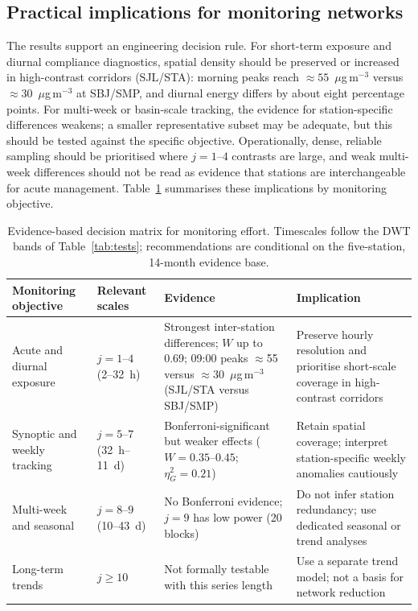 \documentclass[12pt,letterpaper]{article}
\begin{document}
\subsection{Practical implications for monitoring networks}

The results support an engineering decision rule. For short-term exposure and diurnal compliance diagnostics, spatial density should be preserved or increased in high-contrast corridors (SJL/STA): morning peaks reach $\approx 55$~$\mu$g\,m$^{-3}$ versus $\approx 30$~$\mu$g\,m$^{-3}$ at SBJ/SMP, and diurnal energy differs by about eight percentage points. For multi-week or basin-scale tracking, the evidence for station-specific differences weakens; a smaller representative subset may be adequate, but this should be tested against the specific objective. Operationally, dense, reliable sampling should be prioritised where $j=1$--$4$ contrasts are large, and weak multi-week differences should not be read as evidence that stations are interchangeable for acute management. Table~\ref{tab:decision} summarises these implications by monitoring objective.

\begin{table}[htbp]
\centering
\caption{Evidence-based decision matrix for monitoring effort. Timescales follow the DWT bands of Table~\ref{tab:tests}; recommendations are conditional on the five-station, 14-month evidence base.}
\label{tab:decision}
\footnotesize
\setlength{\tabcolsep}{3pt}
\begin{tabularx}{\textwidth}{@{}>{\raggedright\arraybackslash}p{3.0cm}>{\raggedright\arraybackslash}p{2.4cm}>{\raggedright\arraybackslash}X>{\raggedright\arraybackslash}p{4.2cm}@{}}
\toprule
Monitoring objective & Relevant scales & Evidence & Implication \\
\midrule
Acute and diurnal exposure & $j=1$--$4$ (2--32~h) & Strongest inter-station differences; $W$ up to 0.69; 09:00 peaks $\approx$55 versus $\approx$30~$\mu$g\,m$^{-3}$ (SJL/STA versus SBJ/SMP) & Preserve hourly resolution and prioritise short-scale coverage in high-contrast corridors \\
Synoptic and weekly tracking & $j=5$--$7$ (32~h--11~d) & Bonferroni-significant but weaker effects ($W=0.35$--$0.45$; $\eta_G^2=0.21$) & Retain spatial coverage; interpret station-specific weekly anomalies cautiously \\
Multi-week and seasonal & $j=8$--$9$ (10--43~d) & No Bonferroni evidence; $j=9$ has low power (20 blocks) & Do not infer station redundancy; use dedicated seasonal or trend analyses \\
Long-term trends & $j\ge10$ & Not formally testable with this series length & Use a separate trend model; not a basis for network reduction \\
\bottomrule
\end{tabularx}
\end{table}
\end{document}
